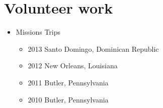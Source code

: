 \documentclass[11pt,a4paper,sans]{moderncv}        %
\begin{document}

\section{Volunteer work}
\begin{itemize}
\item {Missions Trips
    \begin{itemize}
    \item 2013 Santo Domingo, Dominican Republic
    \item 2012 New Orleans, Louisiana
    \item 2011 Butler, Pennsylvania
    \item 2010 Butler, Pennsylvania
    \end{itemize}}
\end{itemize}
\end{document}
